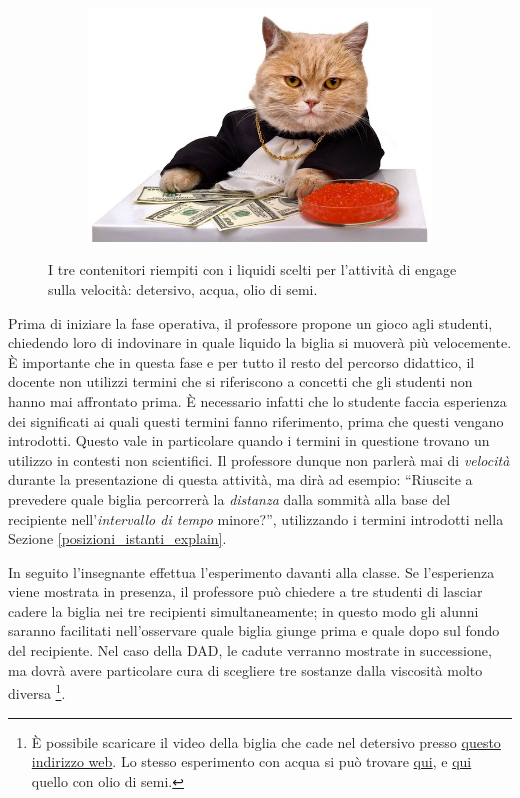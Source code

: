 \documentclass{report} \usepackage[T1]{fontenc} \usepackage[italian]{babel}
\begin{document}
\begin{figure}[H]
\begin{subfigure}[b]{0.5\textwidth}
  \includegraphics[width=\textwidth]{cat_caviar}
  \end{subfigure}
  \caption{
           I tre contenitori riempiti con i liquidi
           scelti per l'attività di engage sulla
           velocità: detersivo, acqua, olio di semi.
          }
  \label{fig:liquids}
\end{figure}
Prima di iniziare la fase operativa, il professore propone un gioco
agli studenti, chiedendo loro di indovinare in quale liquido la biglia
si muoverà più velocemente. \`E importante che in questa fase e per
tutto il resto del percorso didattico, il docente non utilizzi termini
che si riferiscono a concetti che gli studenti non hanno mai
affrontato prima. \`E necessario infatti che lo studente faccia
esperienza dei significati ai quali questi termini fanno riferimento,
prima che questi vengano introdotti. Questo vale in particolare
quando i termini in questione trovano un utilizzo in contesti
non scientifici\cite{arons1997teaching}.
Il professore dunque non parlerà mai di \emph{velocità} durante
la presentazione di questa attività, ma dirà ad esempio:
``Riuscite a prevedere quale biglia percorrerà la \emph{distanza}
dalla sommità alla base del recipiente nell'\emph{intervallo di tempo}
minore?'', utilizzando i termini introdotti nella Sezione
\ref{posizioni_istanti_explain}.

In seguito l'insegnante effettua l'esperimento davanti alla classe.
Se l'esperienza viene mostrata in presenza, il professore
può chiedere a tre studenti di lasciar cadere la biglia nei tre recipienti
simultaneamente; in questo modo gli alunni saranno facilitati
nell'osservare quale biglia giunge prima e quale dopo sul fondo del
recipiente. Nel caso della DAD, le cadute verranno mostrate in successione,
 ma dovrà avere particolare cura di scegliere tre sostanze dalla
viscosità molto diversa
\footnote{
          \`E possibile scaricare il video della biglia che
          cade nel detersivo presso
          \textcolor{blue}{\href{https://github.com/savaroskij/PED1/blob/master/progetto_finale/media/video/biglia_detersivo.mp4?raw=true}{questo indirizzo web}}.
          Lo stesso esperimento con acqua si può trovare
          \textcolor{blue}{\href{http://burymewithmymoney.com/}{qui}},
          e
          \textcolor{blue}{\href{http://burymewithmymoney.com/}{qui}}
          quello con olio di semi.
         }.
\end{document}
